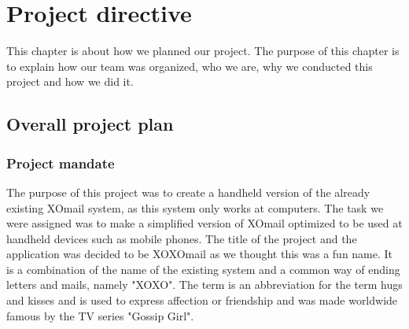 \chapter{Project directive}

This chapter is about how we planned our project. The purpose of this chapter is to explain how our team was organized, who we are, why we conducted this project and how we did it.

\section{Overall project plan}

\subsection{Project mandate}
The purpose of this project was to create a handheld version of the already existing XOmail system, as this system only works at computers. The task we were assigned was to make a simplified version of XOmail optimized to be used at handheld devices such as mobile phones.
\newline
\newline 
The title of the project and the application was decided to be XOXOmail as we thought this was a fun name. It is a combination of the name of the existing system and a common way of ending letters and mails, namely "XOXO". The term is an abbreviation for the term hugs and kisses and is used to express affection or friendship and was made worldwide famous by the TV series "Gossip Girl".

